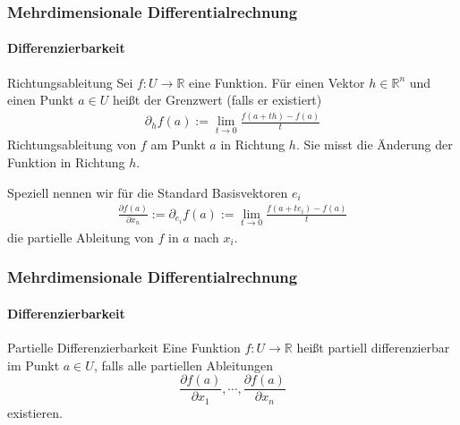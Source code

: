 \documentclass{beamer}
\begin{document}
\begin{frame}
    \frametitle{Mehrdimensionale Differentialrechnung}
\framesubtitle{Differenzierbarkeit}
    \begin{block}{Richtungsableitung}
Sei $f: U \to \mathbb{R}$ eine Funktion. Für einen Vektor $h \in  \mathbb{R}^n$  und einen Punkt  $a \in U$ heißt der Grenzwert (falls er existiert) 
\begin{align*}
\partial_h f(a) := \lim_{t \to 0} \frac{f(a + th) - f(a)}{t}
\end{align*}
Richtungsableitung von $f$ am Punkt $a$ in Richtung $h$. Sie misst die Änderung der Funktion in Richtung $h$.

Speziell nennen wir für die Standard Basisvektoren $e_i$ 
\begin{align*}
\frac{\partial f(a)}{\partial x_n}  := \partial_{e_i} f(a) := \lim_{t \to 0} \frac{f(a + t e_i) - f(a)}{t}
\end{align*}
die partielle Ableitung von $f$ in $a$ nach $x_i$.
\end{block}


 \end{frame}

\begin{frame}
    \frametitle{Mehrdimensionale Differentialrechnung}
\framesubtitle{Differenzierbarkeit}
    \begin{block}{Partielle Differenzierbarkeit }
Eine Funktion  $f: U \to \mathbb{R}$ heißt partiell differenzierbar im Punkt $a \in U$, falls alle partiellen Ableitungen 
$$\frac{\partial f(a)}{\partial x_1}, \cdots , \frac{\partial f(a)}{\partial x_n}$$ 
existieren.
\end{block}


 \end{frame}
\end{document}
